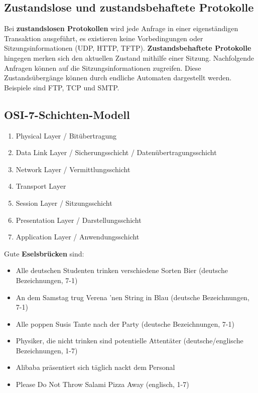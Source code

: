 \documentclass{article} %
\begin{document}
\subsection{Zustandslose und zustandsbehaftete Protokolle}
Bei \textbf{zustandslosen Protokollen} wird jede Anfrage in einer eigenständigen Transaktion ausgeführt, es existieren keine Vorbedingungen oder Sitzungsinformationen (UDP, HTTP, TFTP).
\textbf{Zustandsbehaftete Protokolle} hingegen merken sich den aktuellen Zustand mithilfe einer Sitzung.
Nachfolgende Anfragen können auf die Sitzungsinformationen zugreifen.
Diese Zustandsübergänge können durch endliche Automaten dargestellt werden.
Beispiele sind FTP, TCP und SMTP.

\subsection{OSI-7-Schichten-Modell}

\begin{enumerate}
	\item Physical Layer / Bitübertragung
	\item Data Link Layer / Sicherungsschicht / Datenübertragungsschicht
	\item Network Layer / Vermittlungsschicht
	\item Transport Layer
	\item Session Layer / Sitzungsschicht
	\item Presentation Layer / Darstellungsschicht
	\item Application Layer / Anwendungsschicht
\end{enumerate}

Gute \textbf{Eselsbrücken} sind:
\begin{itemize}
	\item Alle deutschen Studenten trinken verschiedene Sorten Bier (deutsche Bezeichnungen, 7-1)
	\item An dem Samstag trug Verena 'nen String in Blau (deutsche Bezeichnungen, 7-1)
	\item Alle poppen Susis Tante nach der Party (deutsche Bezeichnungen, 7-1)
	\item Physiker, die nicht trinken sind potentielle Attentäter (deutsche/englische Bezeichnungen, 1-7)
	\item Alibaba präsentiert sich täglich nackt dem Personal
	\item  Please Do Not Throw Salami Pizza Away (englisch, 1-7)
\end{itemize}
\end{document}
